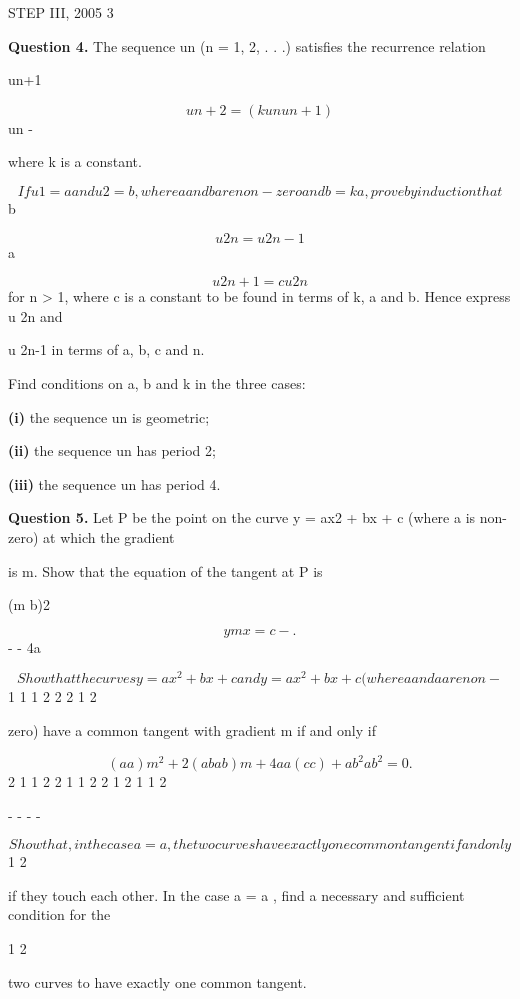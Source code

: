 \documentclass[12pt]{article}
\begin{document}
\begin{flushleft}
STEP III, 2005 3\par
\bigskip\textbf{Question 4.} The sequence un (n = 1, 2, . . .) satisfies the recurrence relation\par
un+1\par
\[un+2 = (kun un+1)\]
un -\par
where k is a constant.\par
\[If u 1 = a and u 2 = b , where a and b are non-zero and b = ka , prove by induction that\]
b\par
\[u 2n = u 2n-1\]
a\par
\gamma \delta\par
\[u 2n+1 = cu 2n\]
for n > 1, where c is a constant to be found in terms of k, a and b. Hence express u 2n and\par
u 2n-1 in terms of a, b, c and n.\par
Find conditions on a, b and k in the three cases:\par
\textbf{(i)} the sequence un is geometric;\par
\textbf{(ii)} the sequence un has period 2;\par
\textbf{(iii)} the sequence un has period 4.\par
\bigskip\textbf{Question 5.} Let P be the point on the curve y = ax2 + bx + c (where a is non-zero) at which the gradient\par
is m. Show that the equation of the tangent at P is\par
(m b)2\par
\[y mx = c - .\]
- - 4a\par
\[Show that the curves y = a x^2 + b x + c and y = a x^2 + b x + c (where a and a are non-\]
1 1 1 2 2 2 1 2\par
zero) have a common tangent with gradient m if and only if\par
\[(a a )m^2 + 2(a b a b )m + 4a a (c c ) + a b^2 a b^2 = 0 .\]
2 1 1 2 2 1 1 2 2 1 2 1 1 2\par
- - - -\par
\[Show that, in the case a = a , the two curves have exactly one common tangent if and only\]
1 2\par
if they touch each other. In the case a = a , find a necessary and sufficient condition for the\par
1 2\par
two curves to have exactly one common tangent.\par
\end{flushleft}
\end{document}
